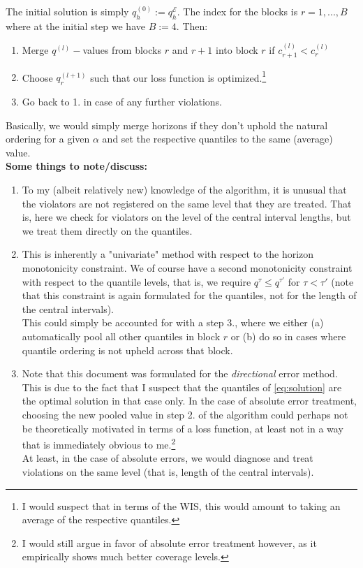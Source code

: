 \documentclass{article}
\begin{document}
The initial solution is simply $q_h^{(0)} := q_h^{\mathcal{E}}$. The index for the blocks is $r = 1, . . . , B$ where at the initial step we have $B := 4$. Then:
\begin{enumerate}
\item Merge $q^{(l)}-$values from blocks $r$ and $r+1$ into block $r$ if $c_{r+1}^{(l)}<c_{r}^{(l)}$
\item Choose $q_{r}^{(l+1)}$ such that our loss function is optimized.\footnote{I would suspect that in terms of the WIS, this would amount to taking an average of the respective quantiles.} 
\item Go back to 1. in case of any further violations. 
\end{enumerate}
Basically, we would simply merge horizons if they don't uphold the natural ordering for a given $\alpha$ and set the respective quantiles to the same (average) value.\bigskip\\ 
\noindent
\textbf{Some things to note/discuss:}
\begin{enumerate}
	\item To my (albeit relatively new) knowledge of the algorithm, it is unusual that the violators are not registered on the same level that they are treated. That is, here we check for violators on the level of the central interval lengths, but we treat them directly on the quantiles. 
	\item This is inherently a "univariate" method with respect to the horizon monotonicity constraint. We of course have a second monotonicity constraint with respect to the quantile levels, that is, we require $q^{\tau} \leq q^{\tau'}$ for $\tau < \tau'$ (note that this constraint is again formulated for the quantiles, not for the length of the central intervals).\\ 
	This could simply be accounted for with a step 3., where we either (a) automatically pool all other quantiles in block $r$ or (b) do so in cases where quantile ordering is not upheld across that block. 
	\item Note that this document was formulated for the \textit{directional} error method. This is due to the fact that I suspect that the quantiles of \eqref{eq:solution} are the optimal solution in that case only. In the case of absolute error treatment, choosing the new pooled value in step 2. of the algorithm could perhaps not be theoretically motivated in terms of a loss function, at least not in a way that is immediately obvious to me.\footnote{I would still argue in favor of absolute error treatment however, as it empirically shows much better coverage levels.} \\ 
	At least, in the case of absolute errors, we would diagnose and treat violations on the same level (that is, length of the central intervals).
\end{enumerate}


\end{document}
